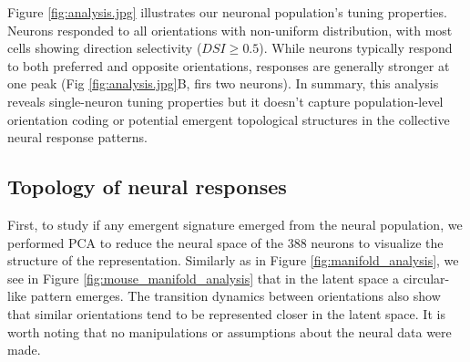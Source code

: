 \documentclass[11pt,a4paper]{article}
\begin{document}
Figure \ref{fig:analysis.jpg} illustrates our neuronal population's tuning properties. Neurons responded to all orientations with non-uniform distribution, with most cells showing direction selectivity ($DSI\geq0.5$). While neurons typically respond to both preferred and opposite orientations, responses are generally stronger at one peak (Fig \ref{fig:analysis.jpg}B, firs two neurons). In summary, this analysis reveals single-neuron tuning properties but it doesn't capture population-level orientation coding or potential emergent topological structures in the collective neural response patterns.

\subsection{Topology of neural responses}

First, to study if any emergent signature emerged from the neural population, we performed PCA to reduce the neural space of the 388 neurons to visualize the structure of the representation. Similarly as in Figure \ref{fig:manifold_analysis}, we see in Figure \ref{fig:mouse_manifold_analysis} that in the latent space a circular-like pattern emerges. The transition dynamics between orientations also show that similar orientations tend to be represented closer in the latent space. It is worth noting that no manipulations or assumptions about the neural data were made. 
\end{document}

